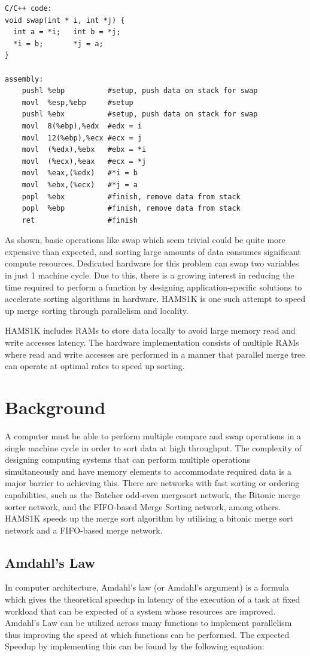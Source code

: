 \documentclass{article}
\begin{document}
\begin{lstlisting}
C/C++ code:
void swap(int * i, int *j) {
  int a = *i;   int b = *j;
  *i = b;       *j = a;
}

assembly:
    pushl %ebp          #setup, push data on stack for swap
    movl  %esp,%ebp     #setup
    pushl %ebx          #setup, push data on stack for swap
    movl  8(%ebp),%edx  #edx = i
    movl  12(%ebp),%ecx #ecx = j
    movl  (%edx),%ebx   #ebx = *i
    movl  (%ecx),%eax   #ecx = *j
    movl  %eax,(%edx)   #*i = b
    movl  %ebx,(%ecx)   #*j = a
    popl  %ebx          #finish, remove data from stack
    popl  %ebp          #finish, remove data from stack
    ret                 #finish
\end{lstlisting}

As shown, basic operations like swap which seem trivial could be quite more expensive than expected, and sorting large amounts of data consumes significant compute resources. Dedicated hardware for this problem can swap two variables in just 1 machine cycle. Due to this, there is a growing interest in reducing the time required to perform a function by designing application-specific solutions to accelerate sorting algorithms in hardware. HAMS1K is one such attempt to speed up merge sorting through parallelism and locality.

HAMS1K includes RAMs to store data locally to avoid large memory read and write accesses latency. The hardware implementation consists of multiple RAMs where read and write accesses are performed in a manner that parallel merge tree can operate at optimal rates to speed up sorting. 


\section{Background}
A computer must be able to perform multiple compare and swap operations in a single machine cycle in order to sort data at high throughput. The complexity of designing computing systems that can perform multiple operations simultaneously and have memory elements to accommodate required data is a major barrier to achieving this. There are networks with fast sorting or ordering capabilities, such as the Batcher odd-even mergesort network, the Bitonic merge sorter network, and the FIFO-based Merge Sorting network, among others. HAMS1K speeds up the merge sort algorithm by utilising a bitonic merge sort network and a FIFO-based merge network.  

\subsection{Amdahl's Law}
In computer architecture, Amdahl's law (or Amdahl's argument) is a formula which gives the theoretical speedup in latency of the execution of a task at fixed workload that can be expected of a system whose resources are improved. Amdahl's Law can be utilized across many functions to implement parallelism thus improving the speed at which functions can be performed. The expected Speedup by implementing this can be found by the following equation:
\end{document}
